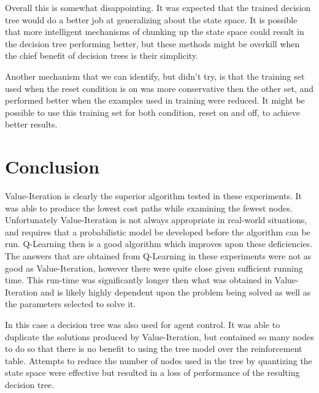 \documentclass[12pt,letterpaper]{article}
\begin{document}
Overall this is somewhat disappointing. It was expected that the trained decision tree would do a better job at generalizing about the state space. It is possible that more intelligent mechanisms of chunking up the state space could result in the decision tree performing better, but these methods might be overkill when the chief benefit of decision trees is their simplicity. 

Another mechanism that we can identify, but didn't try, is that the training set used when the reset condition is on was more conservative then the other set, and performed better when the examples used in training were reduced. It might be possible to use this training set for both condition, reset on and off, to achieve better results. 

\section{Conclusion}
Value-Iteration is clearly the superior algorithm tested in these experiments. It was able to produce the lowest cost paths while examining the fewest nodes. Unfortunately Value-Iteration is not always appropriate in real-world situations, and requires that a probabilistic model be developed before the algorithm can be run. Q-Learning then is a good algorithm which improves upon these deficiencies. The answers that are obtained from Q-Learning in these experiments were not as good as Value-Iteration, however there were quite close given sufficient running time. This run-time was significantly longer then what was obtained in Value-Iteration and is likely highly dependent upon the problem being solved as well as the parameters selected to solve it. 

In this case a decision tree was also used for agent control. It was able to duplicate the solutions produced by Value-Iteration, but contained so many nodes to do so that there is no benefit to using the tree model over the reinforcement table. Attempts to reduce the number of nodes used in the tree by quantizing the state space were effective but resulted in a loss of performance of the resulting decision tree. 



\end{document}
